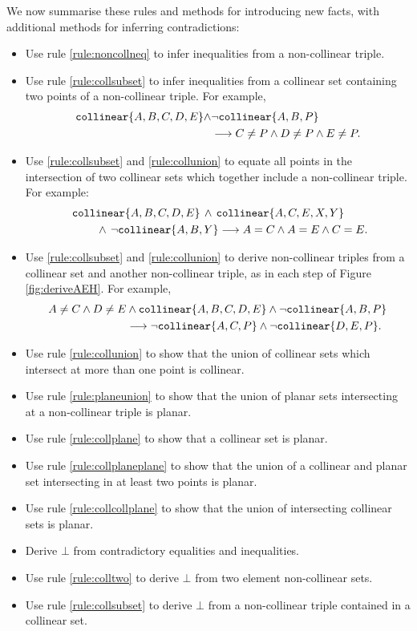 We now summarise these rules and methods for introducing new facts, with additional methods for inferring contradictions:
\begin{itemize}\label{list:Procedures}
\item Use rule \ref{rule:noncollneq} to infer inequalities from a non-collinear triple.
\item Use rule \ref{rule:collsubset} to infer inequalities from a collinear set containing two points of a non-collinear triple. For example, 
\begin{align*}
\texttt{collinear} \{A, B, C, D, E\} \wedge & \neg\texttt{collinear} \{A, B, P\}\\
&\longrightarrow C \neq P \wedge D \neq P \wedge E \neq P.
\end{align*}
\item Use \ref{rule:collsubset} and \ref{rule:collunion} to equate all points in the intersection of two collinear sets which together include a non-collinear triple. For example:
\begin{align*}\
&\texttt{collinear} \{A, B, C, D, E\} \,\wedge\,\texttt{collinear} \{A, C, E, X, Y\}\\ 
&\qquad\, \wedge\,\neg\texttt{collinear} \{A, B, Y\}\longrightarrow A = C \wedge A = E \wedge C = E.
\end{align*}
\item Use \ref{rule:collsubset} and \ref{rule:collunion} to derive non-collinear triples from a collinear set and another non-collinear triple, as in each step of Figure \ref{fig:deriveAEH}. For example,
\begin{align*}
A \neq C \wedge D \neq E &\wedge \texttt{collinear} \{A, B, C, D, E\} \wedge \neg\texttt{collinear} \{A, B, P\}\\
&\longrightarrow \neg\texttt{collinear} \{A, C, P\} \wedge \neg\texttt{collinear} \{D, E, P\}.
\end{align*}
\item Use rule \ref{rule:collunion} to show that the union of collinear sets which intersect at more than one point is collinear.
\item Use rule \ref{rule:planeunion} to show that the union of planar sets intersecting at a non-collinear triple is planar.
\item Use rule \ref{rule:collplane} to show that a collinear set is planar.
\item Use rule \ref{rule:collplaneplane} to show that the union of a collinear and planar set intersecting in at least two points is planar.
\item Use rule \ref{rule:collcollplane} to show that the union of intersecting collinear sets is planar.
\item Derive $\bot$ from contradictory equalities and inequalities.
\item Use rule \ref{rule:colltwo} to derive $\bot$ from two element non-collinear sets.
\item Use rule \ref{rule:collsubset} to derive $\bot$ from a non-collinear triple contained in a collinear set.
\end{itemize}

